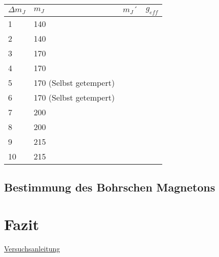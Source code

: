\documentclass[bigchapter,colorback,accentcolor=tud4b,linedtoc,11pt]{tudreport}
\begin{document}
\begin{center}
  \begin{tabular}{|p{2cm}|p{2cm}|p{2cm}|p{2cm}|}
    \hline
    $\Delta m_J$ & $m_J$ & $m_J´$ & $g_{eff}$ \\ \hline
    1               & 140                                        &  &  \\ \hline
    2               & 140                                        &  &  \\ \hline
    3               & 170                                        &  &  \\ \hline
    4               & 170                                        &  &  \\ \hline
    5               & 170 (Selbst getempert)                     &  &  \\ \hline
    6               & 170 (Selbst getempert)                     &  &  \\ \hline
    7               & 200                                        &  &  \\ \hline
    8               & 200                                        &  &  \\ \hline
    9               & 215                                        &  &  \\ \hline
    10              & 215                                        &  &  \\ \hline
	\end{tabular}
\end{center}

\section{Bestimmung des Bohrschen Magnetons}
\chapter{Fazit}

\cleardoublepage{}
\newpage
\begin{thebibliography}{100}
   \url{Versuchsanleitung}
\end{thebibliography}
\end{document}
